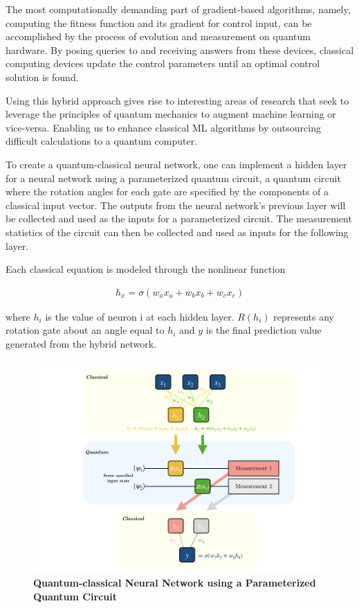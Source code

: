 \documentclass{scrartcl}
\begin{document}
The most computationally demanding part of gradient-based algorithms, namely, computing the fitness function and its gradient for control input, can be accomplished by the process of evolution and measurement on quantum hardware. By posing queries to and receiving answers from these devices, classical computing devices update the control parameters until an optimal control solution is found.

Using this hybrid approach gives rise to interesting areas of research that seek to leverage the principles of quantum mechanics to augment machine learning or vice-versa. Enabling us to enhance classical ML algorithms by outsourcing difficult calculations to a quantum computer.

To create a quantum-classical neural network, one can implement a hidden layer for a neural network using a parameterized quantum circuit, a quantum circuit where the rotation angles for each gate are specified by the components of a classical input vector. The outputs from the neural network's previous layer will be collected and used as the inputs for a parameterized circuit. The measurement statistics of the circuit can then be collected and used as inputs for the following layer.

Each classical equation is modeled through the nonlinear function

\begin{align}
h_{x}=\sigma(w_{a}x_{a}+w_{b}x_{b}+w_{c}x_{c})
\end{align}

where \(h_{i}\) is the value of neuron i at each hidden layer. \(R(h_{i})\) represents any rotation gate about an angle equal to \(h_{i}\) and \(y\) is the final prediction value generated from the hybrid network.

\begin{figure}[htbp]
\centering
\includegraphics[width=.9\linewidth]{./assets/neuralnetworkQC.png}
\caption{\textbf{Quantum-classical Neural Network using a Parameterized Quantum Circuit}}
\end{figure}
\end{document}
